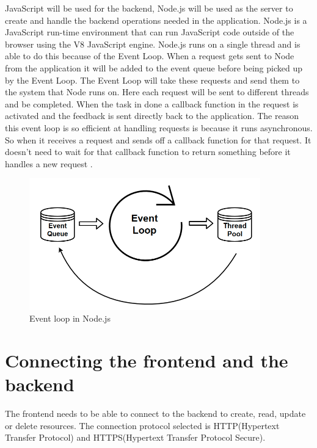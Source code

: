 JavaScript will be used for the backend, Node.js will be used as the server to create and handle the backend operations needed in the application. Node.js is a JavaScript run-time environment that can run JavaScript code outside of the browser using the V8 JavaScript engine. Node.js runs on a single thread and is able to do this because of the Event Loop. When a request gets sent to Node from the application it will be added to the event queue before being picked up by the Event Loop. The Event Loop will take these requests and send them to the system that Node runs on. Here each request will be sent to different threads and be completed. When the task in done a callback function in the request is activated and the feedback is sent directly back to the application. The reason this event loop is so efficient at handling requests is because it runs asynchronous. So when it receives a request and sends off a callback function for that request. It doesn't need to wait for that callback function to return something before it handles a new request \cite{Node-event-loop}.

\begin{figure}[h]
    \centering
    \includegraphics[width=100mm,scale=1]{figures/event_loop.png}
    \caption{Event loop in Node.js}
    \label{fig:Node_Event_Loop}
\end{figure}

\section{Connecting the frontend and the backend}
The frontend needs to be able to connect to the backend to create, read, update or delete resources.
The connection protocol selected is HTTP(Hypertext Transfer Protocol) and HTTPS(Hypertext Transfer Protocol Secure).

